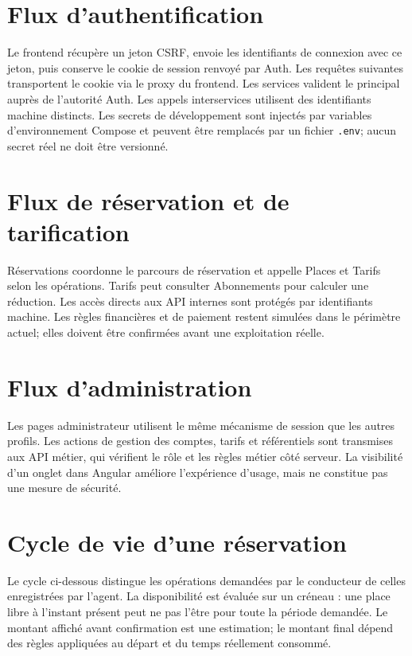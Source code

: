\documentclass[11pt,a4paper]{report}
\begin{document}
\section{Flux d'authentification}
Le frontend récupère un jeton CSRF, envoie les identifiants de connexion avec ce jeton, puis conserve le cookie de session renvoyé par Auth. Les requêtes suivantes transportent le cookie via le proxy du frontend. Les services valident le principal auprès de l'autorité Auth. Les appels interservices utilisent des identifiants machine distincts. Les secrets de développement sont injectés par variables d'environnement Compose et peuvent être remplacés par un fichier \texttt{.env}; aucun secret réel ne doit être versionné.

\section{Flux de réservation et de tarification}
Réservations coordonne le parcours de réservation et appelle Places et Tarifs selon les opérations. Tarifs peut consulter Abonnements pour calculer une réduction. Les accès directs aux API internes sont protégés par identifiants machine. Les règles financières et de paiement restent simulées dans le périmètre actuel; elles doivent être confirmées avant une exploitation réelle.

\section{Flux d'administration}
Les pages administrateur utilisent le même mécanisme de session que les autres profils. Les actions de gestion des comptes, tarifs et référentiels sont transmises aux API métier, qui vérifient le rôle et les règles métier côté serveur. La visibilité d'un onglet dans Angular améliore l'expérience d'usage, mais ne constitue pas une mesure de sécurité.

\section{Cycle de vie d'une réservation}
Le cycle ci-dessous distingue les opérations demandées par le conducteur de celles enregistrées par l'agent. La disponibilité est évaluée sur un créneau : une place libre à l'instant présent peut ne pas l'être pour toute la période demandée. Le montant affiché avant confirmation est une estimation; le montant final dépend des règles appliquées au départ et du temps réellement consommé.
\end{document}
